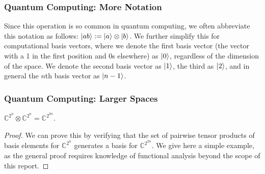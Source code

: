 \documentclass{beamer}
\renewcommand{\ket}{\Ket}
\renewcommand{\ket}{\Ket}
\newcommand{\tensor}{\otimes}
\newcommand{\bb}[1]{\mathbb{#1}}
\begin{document}
\begin{frame}
\frametitle{Quantum Computing: More Notation}
        Since this operation is so common in quantum computing, we often abbreviate this notation as follows: $\ket{ab} := \ket{a} \tensor \ket{b}$.
        We further simplify this for computational basis vectors, where we denote the first basis vector (the vector with a 1 in the first position and 0s elsewhere) as $\ket{0}$, regardless of the dimension of the space.
        We denote the second basis vector as $\ket{1}$, the third as $\ket{2}$, and in general the $n$th basis vector as $\ket{n-1}$.
\end{frame}

\begin{frame}
\frametitle{Quantum Computing: Larger Spaces}
        \begin{theorem}
            $\bb{C}^{2^n} \otimes \bb{C}^{2^n} = \bb{C}^{2^{2n}}$.
        \end{theorem}
        \begin{proof}
                We can prove this by verifying that the set of pairwise tensor products of basis elements for $\bb{C}^{2^n}$ generates a basis for $\bb{C}^{2^{2n}}$.
            We give here a simple example, as the general proof requires knowledge of functional analysis beyond the scope of this report.


\end{proof}
\end{frame}
\end{document}
